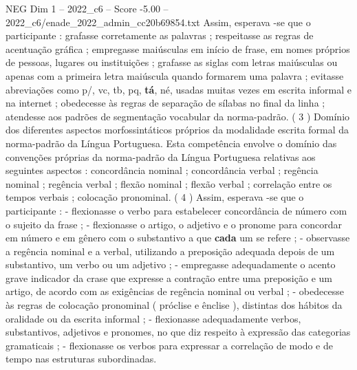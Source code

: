 \begin{textsample}{NEG Dim 1 – 2022\_c6 – Score -5.00 – 2022\_c6/enade\_2022\_admin\_cc20b69854.txt}
Assim, esperava -se que o participante : grafasse corretamente as palavras ; respeitasse as regras de acentuação gráfica ; empregasse maiúsculas em início de frase, em nomes próprios de pessoas, lugares ou instituições ; grafasse as siglas com letras maiúsculas ou apenas com a primeira letra maiúscula quando formarem uma palavra ; evitasse abreviações como p/, vc, tb, pq, \textbf{tá}, né, usadas muitas vezes em escrita informal e na internet ; obedecesse às regras de separação de sílabas no final da linha ; atendesse aos padrões de segmentação vocabular da norma-padrão. ( 3 ) Domínio dos diferentes aspectos morfossintáticos próprios da modalidade escrita formal da norma-padrão da Língua Portuguesa.
Esta competência envolve o domínio das convenções próprias da norma-padrão da Língua Portuguesa relativas aos seguintes aspectos : concordância nominal ; concordância verbal ; regência nominal ; regência verbal ; flexão nominal ; flexão verbal ; correlação entre os tempos verbais ; colocação pronominal. ( 4 ) Assim, esperava -se que o participante : - flexionasse o verbo para estabelecer concordância de número com o sujeito da frase ; - flexionasse o artigo, o adjetivo e o pronome para concordar em número e em gênero com o substantivo a que \textbf{cada} um se refere ; - observasse a regência nominal e a verbal, utilizando a preposição adequada depois de um substantivo, um verbo ou um adjetivo ; - empregasse adequadamente o acento grave indicador da crase que expresse a contração entre uma preposição e um artigo, de acordo com as exigências de regência nominal ou verbal ; - obedecesse às regras de colocação pronominal ( próclise e ênclise ), distintas dos hábitos da oralidade ou da escrita informal ; - flexionasse adequadamente verbos, substantivos, adjetivos e pronomes, no que diz respeito à expressão das categorias gramaticais ; - flexionasse os verbos para expressar a correlação de modo e de tempo nas estruturas subordinadas.

\end{textsample}
